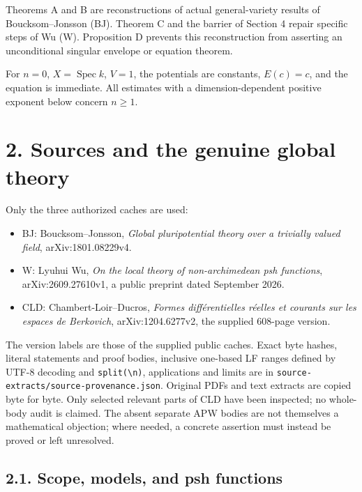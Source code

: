\documentclass[
  11pt,
]{article}
\providecommand{\tightlist}{%
  \setlength{\itemsep}{0pt}\setlength{\parskip}{0pt}}
\begin{document}
Theorems A and B are reconstructions of actual general-variety results
of Boucksom--Jonsson (BJ). Theorem C and the barrier of Section 4 repair
specific steps of Wu (W). Proposition D prevents this reconstruction
from asserting an unconditional singular envelope or equation theorem.

For \(n=0\), \(X=\operatorname{Spec}k\), \(V=1\), the potentials are
constants, \(E(c)=c\), and the equation is immediate. All estimates with
a dimension-dependent positive exponent below concern \(n\geq1\).

\section{2. Sources and the genuine global
theory}\label{sources-and-the-genuine-global-theory}

Only the three authorized caches are used:

\begin{itemize}
\tightlist
\item
  BJ: Boucksom--Jonsson, \emph{Global pluripotential theory over a
  trivially valued field}, arXiv:1801.08229v4.
\item
  W: Lyuhui Wu, \emph{On the local theory of non-archimedean psh
  functions}, arXiv:2609.27610v1, a public preprint dated September
  2026.
\item
  CLD: Chambert-Loir--Ducros, \emph{Formes différentielles réelles et
  courants sur les espaces de Berkovich}, arXiv:1204.6277v2, the
  supplied 608-page version.
\end{itemize}

The version labels are those of the supplied public caches. Exact byte
hashes, literal statements and proof bodies, inclusive one-based LF
ranges defined by UTF-8 decoding and
\texttt{split(\textquotesingle{}\textbackslash{}n\textquotesingle{})},
applications and limits are in
\texttt{source-extracts/source-provenance.json}. Original PDFs and text
extracts are copied byte for byte. Only selected relevant parts of CLD
have been inspected; no whole-body audit is claimed. The absent separate
APW bodies are not themselves a mathematical objection; where needed, a
concrete assertion must instead be proved or left unresolved.

\subsection{2.1. Scope, models, and psh
functions}\label{scope-models-and-psh-functions}
\end{document}
